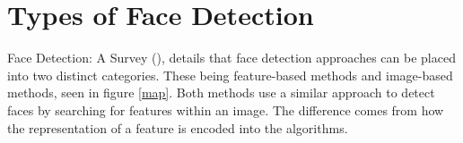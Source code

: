 \documentclass{l4proj}
\begin{document}
\section{Types of Face Detection}
Face Detection: A Survey (\cite{survey}), details that face detection approaches can be placed into two distinct categories. These being feature-based methods and image-based methods, seen in figure \ref{map}. Both methods use a similar approach to detect faces by searching for features within an image. The difference comes from how the representation of a feature is encoded into the algorithms.
\end{document}
